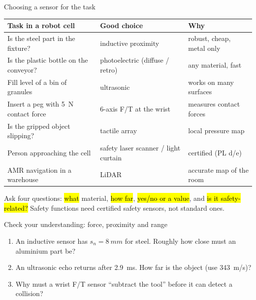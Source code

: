 \documentclass[aspectratio=169,10pt]{beamer}
\begin{document}
\begin{frame}{Choosing a sensor for the task}
\small
\renewcommand{\arraystretch}{1.2}
\begin{tabularx}{\linewidth}{@{}X l l@{}}
\toprule
\textbf{Task in a robot cell} & \textbf{Good choice} & \textbf{Why}\\
\midrule
Is the steel part in the fixture? & inductive proximity & robust, cheap, metal only\\
Is the plastic bottle on the conveyor? & photoelectric (diffuse / retro) & any material, fast\\
Fill level of a bin of granules & ultrasonic & works on many surfaces\\
Insert a peg with \SI{5}{N} contact force & 6-axis F/T at the wrist & measures contact forces\\
Is the gripped object slipping? & tactile array & local pressure map\\
Person approaching the cell & safety laser scanner / light curtain & certified (PL d/e)\\
AMR navigation in a warehouse & LiDAR & accurate map of the room\\
\bottomrule
\end{tabularx}

\vspace{3mm}
\begin{notebox}
\small Ask four questions: \hl{what} material, \hl{how far}, \hl{yes/no or a value}, and \hl{is it safety-related?} Safety functions need certified safety sensors, not standard ones.
\end{notebox}
\end{frame}

\begin{frame}{Check your understanding: force, proximity and range}
\begin{keybox}
\large
\begin{enumerate}
\item An inductive sensor has $s_n=\SI{8}{mm}$ for steel. Roughly how close must an aluminium part be?
\item An ultrasonic echo returns after \SI{2.9}{ms}. How far is the object (use \SI{343}{m/s})?
\item Why must a wrist F/T sensor ``subtract the tool'' before it can detect a collision?
\end{enumerate}
\end{keybox}
\end{frame}
\end{document}
